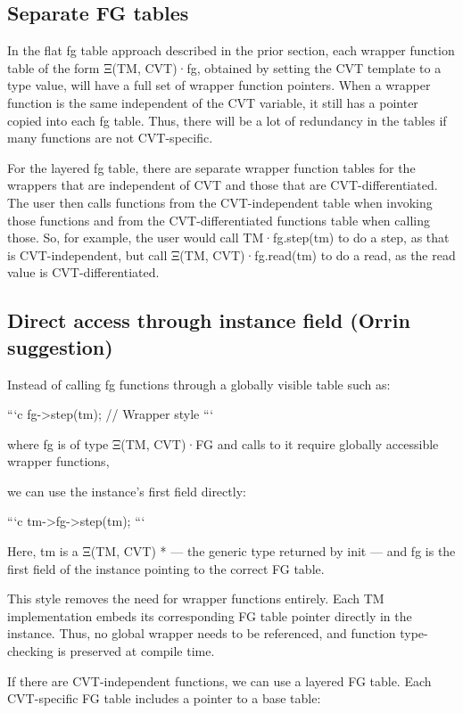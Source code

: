 \documentclass[11pt]{article}
\begin{document}
\subsection{Separate FG tables}
\label{sec:orgafbf17c}

In the flat fg table approach described in the prior section, each wrapper function table of the form Ξ(TM, CVT)·fg, obtained by setting the CVT template to a type value, will have a full set of wrapper function pointers. When a wrapper function is the same independent of the CVT variable, it still has a pointer copied into each fg table. Thus, there will be a lot of redundancy in the tables if many functions are not CVT-specific.

For the layered fg table, there are separate wrapper function tables for the wrappers that are independent of CVT and those that are CVT-differentiated. The user then calls functions from the CVT-independent table when invoking those functions and from the CVT-differentiated functions table when calling those. So, for example, the user would call TM·fg.step(tm) to do a step, as that is CVT-independent, but call Ξ(TM, CVT)·fg.read(tm) to do a read, as the read value is CVT-differentiated.

\subsection{Direct access through instance field (Orrin suggestion)}
\label{sec:orgfe58dd7}

Instead of calling fg functions through a globally visible table such as:

```c
fg->step(tm); // Wrapper style
```

where fg is of type Ξ(TM, CVT)·FG and calls to it require globally accessible wrapper functions,

we can use the instance's first field directly:

```c
tm->fg->step(tm);
```

Here, tm is a Ξ(TM, CVT) * — the generic type returned by init — and fg is the first field of the instance pointing to the correct FG table.

This style removes the need for wrapper functions entirely. Each TM implementation embeds its corresponding FG table pointer directly in the instance. Thus, no global wrapper needs to be referenced, and function type-checking is preserved at compile time.

If there are CVT-independent functions, we can use a layered FG table. Each CVT-specific FG table includes a pointer to a base table:
\end{document}
